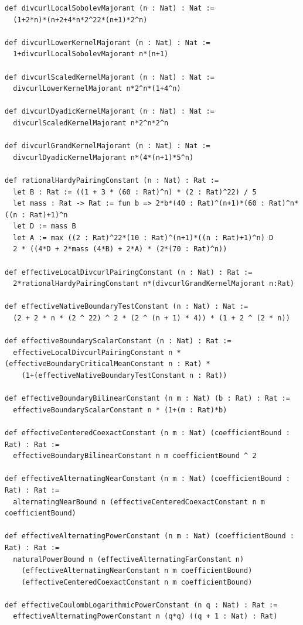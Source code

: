 \documentclass[reqno,11pt]{amsart}
\numberwithin{equation}{section}
\theoremstyle{definition}
\theoremstyle{remark}
\begin{document}
\begin{lstlisting}
def divcurlLocalSobolevMajorant (n : Nat) : Nat :=
  (1+2*n)*(n+2+4*n*2^22*(n+1)*2^n)

def divcurlLowerKernelMajorant (n : Nat) : Nat :=
  1+divcurlLocalSobolevMajorant n*(n+1)

def divcurlScaledKernelMajorant (n : Nat) : Nat :=
  divcurlLowerKernelMajorant n*2^n*(1+4^n)

def divcurlDyadicKernelMajorant (n : Nat) : Nat :=
  divcurlScaledKernelMajorant n*2^n*2^n

def divcurlGrandKernelMajorant (n : Nat) : Nat :=
  divcurlDyadicKernelMajorant n*(4*(n+1)*5^n)

def rationalHardyPairingConstant (n : Nat) : Rat :=
  let B : Rat := ((1 + 3 * (60 : Rat)^n) * (2 : Rat)^22) / 5
  let mass : Rat -> Rat := fun b => 2*b*(40 : Rat)^(n+1)*(60 : Rat)^n*((n : Rat)+1)^n
  let D := mass B
  let A := max ((2 : Rat)^22*(10 : Rat)^(n+1)*((n : Rat)+1)^n) D
  2 * ((4*D + 2*mass (4*B) + 2*A) * (2*(70 : Rat)^n))

def effectiveLocalDivcurlPairingConstant (n : Nat) : Rat :=
  2*rationalHardyPairingConstant n*(divcurlGrandKernelMajorant n:Rat)

def effectiveNativeBoundaryTestConstant (n : Nat) : Nat :=
  (2 + 2 * n * (2 ^ 22) ^ 2 * (2 ^ (n + 1) * 4)) * (1 + 2 ^ (2 * n))

def effectiveBoundaryScalarConstant (n : Nat) : Rat :=
  effectiveLocalDivcurlPairingConstant n * (effectiveBoundaryCriticalMeanConstant n : Rat) *
    (1+(effectiveNativeBoundaryTestConstant n : Rat))

def effectiveBoundaryBilinearConstant (n m : Nat) (b : Rat) : Rat :=
  effectiveBoundaryScalarConstant n * (1+(m : Rat)*b)

def effectiveCenteredCoexactConstant (n m : Nat) (coefficientBound : Rat) : Rat :=
  effectiveBoundaryBilinearConstant n m coefficientBound ^ 2

def effectiveAlternatingNearConstant (n m : Nat) (coefficientBound : Rat) : Rat :=
  alternatingNearBound n (effectiveCenteredCoexactConstant n m coefficientBound)

def effectiveAlternatingPowerConstant (n m : Nat) (coefficientBound : Rat) : Rat :=
  naturalPowerBound n (effectiveAlternatingFarConstant n)
    (effectiveAlternatingNearConstant n m coefficientBound)
    (effectiveCenteredCoexactConstant n m coefficientBound)

def effectiveCoulombLogarithmicPowerConstant (n q : Nat) : Rat :=
  effectiveAlternatingPowerConstant n (q*q) ((q + 1 : Nat) : Rat)


\end{lstlisting}
\end{document}
